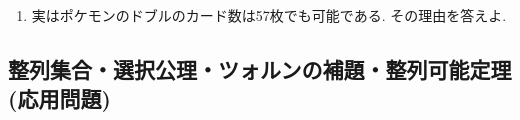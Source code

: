\documentclass[dvipdfmx,a4paper,11pt]{article}
\theoremstyle{definition}
\begin{document}
\begin{enumerate}[label=\textbf{問}\ref*{sec-6}.\arabic*]
\begin{enumerate}[label=(\arabic*).]
   「8匹のポケモンが描かれたカードが55枚入っているよ。 2枚のカードに1つだけ共通するポケモンを誰よりも早く見つけよう！\footnote{要は二つのカード$A, B$について, ただ一つのポケモン$x$が存在して, $x$は$A$にも$B$にも描かれている, ということ.}」  
 
  さらにポケモンのドブルの説明書を読むとドブルに描かれているポケモンの総数は計57匹である. なぜこのようなことが可能なのだろうか. このドブルの仕組みを$\mathbb{F}_{7}\mathbb{P}^2$の視点から論ぜよ. 
  \item 実はポケモンのドブルのカード数は57枚でも可能である. その理由を答えよ. 
  \end{enumerate}
  
 \end{enumerate}

 \newpage

 
 \begin{center}
\section{整列集合・選択公理・ツォルンの補題・整列可能定理(応用問題)}
\label{sec-9}
\end{center}
\end{document}
